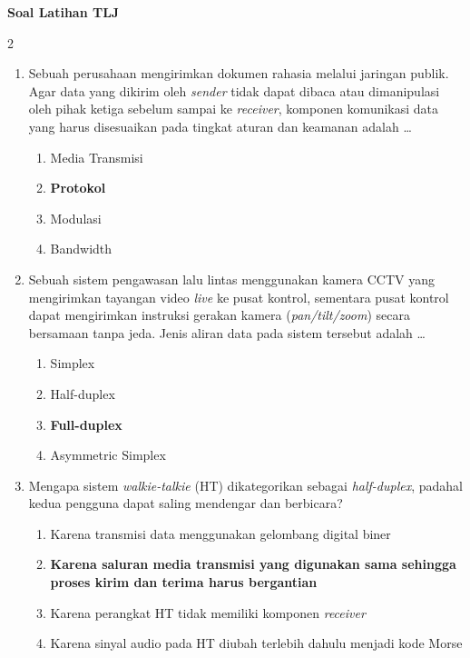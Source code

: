 \documentclass[10pt,a4paper]{article}
\begin{document}
\begin{center}
  \textbf{\Large Soal Latihan TLJ}
\end{center}

\begin{multicols}{2}

\begin{enumerate}
    \item Sebuah perusahaan mengirimkan dokumen rahasia melalui jaringan publik. Agar data yang dikirim oleh \emph{sender} tidak dapat dibaca atau dimanipulasi oleh pihak ketiga sebelum sampai ke \emph{receiver}, komponen komunikasi data yang harus disesuaikan pada tingkat aturan dan keamanan adalah \dots
    \begin{enumerate}
        \item Media Transmisi
        \item \textbf{Protokol}
        \item Modulasi
        \item Bandwidth
    \end{enumerate}

    \item Sebuah sistem pengawasan lalu lintas menggunakan kamera CCTV yang mengirimkan tayangan video \emph{live} ke pusat kontrol, sementara pusat kontrol dapat mengirimkan instruksi gerakan kamera (\emph{pan/tilt/zoom}) secara bersamaan tanpa jeda. Jenis aliran data pada sistem tersebut adalah \dots
    \begin{enumerate}
        \item Simplex
        \item Half-duplex
        \item \textbf{Full-duplex}
        \item Asymmetric Simplex
    \end{enumerate}

    \item Mengapa sistem \emph{walkie-talkie} (HT) dikategorikan sebagai \emph{half-duplex}, padahal kedua pengguna dapat saling mendengar dan berbicara?
    \begin{enumerate}
        \item Karena transmisi data menggunakan gelombang digital biner
        \item \textbf{Karena saluran media transmisi yang digunakan sama sehingga proses kirim dan terima harus bergantian}
        \item Karena perangkat HT tidak memiliki komponen \emph{receiver}
        \item Karena sinyal audio pada HT diubah terlebih dahulu menjadi kode Morse
    \end{enumerate}


\end{enumerate}
\end{multicols}
\end{document}
